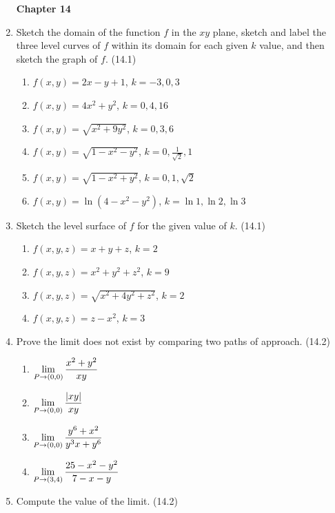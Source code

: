 \begin{enumerate}
\newpage
\centerline{\bf Chapter 14}

    \item Sketch the domain of the function $f$ in the $xy$ plane, sketch and label the three level curves of $f$ within its domain for each given $k$ value, and then sketch the graph of $f$. (14.1)

      \begin{enumerate}
        \item $f(x,y)=2x-y+1$, $k=-3,0,3$
        \item $f(x,y)=4x^2+y^2$, $k=0,4,16$
        \item $f(x,y)=\sqrt{x^2+9y^2}$, $k=0,3,6$
        \item $f(x,y)=\sqrt{1-x^2-y^2}$, $k=0,\frac{1}{\sqrt{2}},1$
        \item $f(x,y)=\sqrt{1-x^2+y^2}$, $k=0,1,\sqrt{2}$ %
        \item $f(x,y)=\ln(4-x^2-y^2)$, $k=\ln1,\ln2,\ln3$
      \end{enumerate}

    \item Sketch the level surface of $f$ for the given value of $k$. (14.1)

      \begin{enumerate}
        \item $f(x,y,z)=x+y+z$, $k=2$
        \item $f(x,y,z)=x^2+y^2+z^2$, $k=9$
        \item $f(x,y,z)=\sqrt{x^2+4y^2+z^2}$, $k=2$
        \item $f(x,y,z)=z-x^2$, $k=3$
      \end{enumerate}

    \item Prove the limit does not exist by comparing two paths of approach. (14.2)

      \begin{enumerate}
        \item $\displaystyle \lim_{P\to(0,0)} \frac{x^2+y^2}{xy}$
        \item $\displaystyle \lim_{P\to(0,0)} \frac{|xy|}{xy}$
        \item $\displaystyle \lim_{P\to(0,0)} \frac{y^6+x^2}{y^3x+y^6}$
        \item $\displaystyle \lim_{P\to(3,4)} \frac{25-x^2-y^2}{7-x-y}$
      \end{enumerate}

    \newpage

    \item Compute the value of the limit. (14.2)


\end{enumerate}
